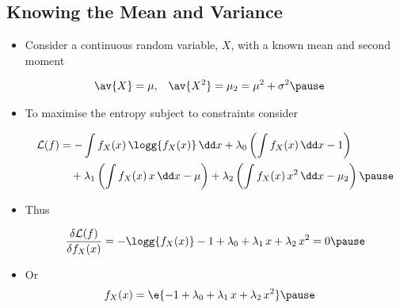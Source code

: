 
\begin{slide}
\section[-2]{Knowing the Mean and Variance}

\begin{PauseHighLight}\small
  \begin{itemize}
  \item Consider a continuous random variable, $X$, with a known mean and
    second moment
    \vspace*{-2cm}
    
    \begin{align*}
      \av{X} &= \mu, & \av{X^2} &= \mu_2 = \mu^2 + \sigma^2\pause
    \end{align*}
    \vspace*{-2cm}
    
  \item To maximise the entropy subject to constraints consider
    \vspace*{-1.5cm}
    
    \begin{align*}
      \mathcal{L}(f) &= -\int f_X(x) \, \logg{f_X(x)} \, \dd x +
                       \lambda_0  \left( \int f_X(x) \, \dd x-1 \right)
      \\
                     &\quad + \lambda_1  \left( \int f_X(x)\, x \, \dd x-\mu\right) +
                       \lambda_2  \left( \int f_X(x)\, x^2 \, \dd x-\mu_2\right)\pause
    \end{align*}
    \vspace*{-2cm}
    
  \item Thus
    \vspace*{-2cm}

    \begin{align*}
      \frac{\delta \mathcal{L}(f)}{\delta f_X(x)} =  - \logg{f_X(x)} -1
      + \lambda_0 + \lambda_1\, x + \lambda_2\, x^2 = 0\pause
    \end{align*}
  \item Or
    \begin{align*}
      f_X(x) &= \e{-1 + \lambda_0 + \lambda_1\, x + \lambda_2\, x^2}\pause
    \end{align*}
  \end{itemize}
\end{PauseHighLight}

\end{slide}

